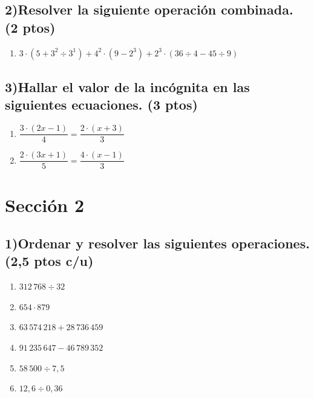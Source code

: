 \documentclass[12pt, letterpaper]{article}
\begin{document}
\vspace{6pt}

\subsection*{2)\quad Resolver la siguiente operación combinada. \hfill\normalfont\small (2 ptos)}
\begin{enumerate}[label=\alph*), leftmargin=*]
  \item $3 \cdot (5 + 3^2 \div 3^1) + 4^2 \cdot (9 - 2^3) + 2^3 \cdot (36 \div 4 - 45 \div 9)$
\end{enumerate}

\vspace{6pt}

\subsection*{3)\quad Hallar el valor de la incógnita en las siguientes ecuaciones. \hfill\normalfont\small (3 ptos)}
\begin{enumerate}[label=\alph*), leftmargin=*]
  \item $\dfrac{3 \cdot (2x - 1)}{4} = \dfrac{2 \cdot (x + 3)}{3}$
  \item $\dfrac{2 \cdot (3x + 1)}{5} = \dfrac{4 \cdot (x - 1)}{3}$
\end{enumerate}

\newpage

\section{Sección 2}

\subsection*{1)\quad Ordenar y resolver las siguientes operaciones. \hfill\normalfont\small (2{,}5 ptos c/u)}
\begin{enumerate}[label=\alph*), leftmargin=*]
  \item $312\,768 \div 32$
  \item $654 \cdot 879$
  \item $63\,574\,218 + 28\,736\,459$
  \item $91\,235\,647 - 46\,789\,352$
  \item $58\,500 \div 7{,}5$
  \item $12{,}6 \div 0{,}36$
\end{enumerate}
\end{document}
